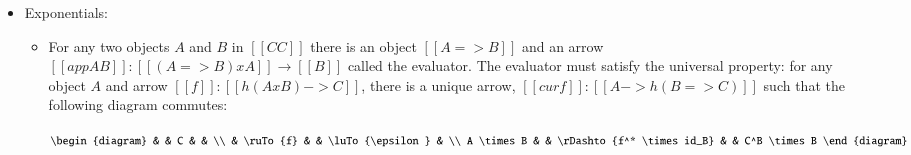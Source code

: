 \documentclass{article}
\begin{document}
\begin{definition}
\begin{center}
\begin{itemize}
\begin{center}
\begin{itemize}
\begin{center}
\begin{math}
\begin{array}{cccccc}
\begin{diagram}
                  [[A]] & \rTo{[[inj1 A B]]} & [[A + B]]
                \end{diagram}
                & \ \ \ \ \ \ &
                \begin{diagram}
                  [[B]] & \rTo{[[inj2 A B]]} & [[A + B]]
                \end{diagram}\\
                & \\
                \begin{diagram}
                    &             & C            & &  \\
                    & \ruTo{f_1}  & \uDashto~{[f_1,f_2]!} & \luTo{f_2} &  \\
                  A & \rTo_{[[inj1 A B]]} & [[A + B]]   & \lTo_{[[inj2 A B]]} & B.\\
                \end{diagram}                
              \end{array}
            \end{math}
          \end{center}

        \item[d.] Exponentials: 
          \begin{center}
            \begin{itemize}
            \item[] For any two objects $A$ and $B$ in $[[CC]]$ there is an object $[[A => B]]$ 
                    and an arrow $[[app A B]] : [[(A => B) x A]] \to [[B]]$ 
                    called the evaluator.  The evaluator must satisfy the
                    universal property: for any object $A$ and arrow $[[f]] : [[h(A x B) -> C]]$, 
                    there is a unique arrow, $[[cur f]] : [[A ->h(B => C)]]$ such that the
                    following diagram commutes:
                    \begin{center}
                      \begin{math}
                        \begin{diagram}
                                 &          &  C                       &                 &  \\
                                 & \ruTo{f} &                          & \luTo{\epsilon} &  \\
                      A \times B &          & \rDashto{f^* \times id_B} &                & C^B \times B
                    \end{diagram}                   
                      \end{math}
                    \end{center}
            \end{itemize}
          \end{center}
        \end{itemize}
      \end{center}
    \end{itemize}
  \end{center}
\end{definition}
\end{document}
